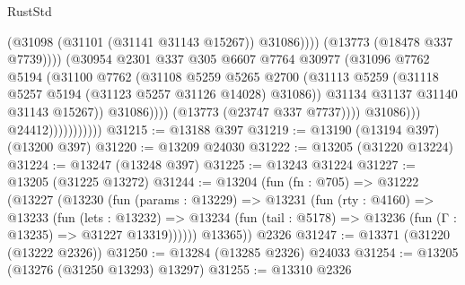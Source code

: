\begin{lexlean}{RustStd}
\begin{coremodule}
                                                  (@31098 (@31101 (@31141 @31143 @15267)) @31086))))
                                            (@13773 (@18478 @337 @7739))))
                                        (@30954
                                          @2301
                                          @337
                                          @305
                                          @6607
                                          @7764
                                          @30977
                                          (@31096
                                            @7762
                                            @5194
                                            (@31100
                                              @7762
                                              (@31108
                                                @5259
                                                @5265
                                                @2700
                                                (@31113
                                                  @5259
                                                  (@31118
                                                    @5257
                                                    @5194
                                                    (@31123 @5257 @31126 @14028)
                                                    @31086))
                                                @31134
                                                @31137
                                                @31140
                                                @31143
                                                @15267))
                                            @31086))))
                                    (@13773 (@23747 @337 @7737))))
                                @31086)))
                          @24412)))))))))))
@31215 := @13188 @397
@31219 := @13190 (@13194 @397) (@13200 @397)
@31220 := @13209 @24030
@31222 := @13205 (@31220 @13224)
@31224 := @13247 (@13248 @397)
@31225 := @13243 @31224
@31227 := @13205 (@31225 @13272)
@31244 := @13204
    (fun (fn : @705) =>
    @31222
      (@13227
        (@13230
          (fun (params : @13229) =>
          @13231
            (fun (rty : @4160) =>
            @13233
              (fun (lets : @13232) =>
              @13234 (fun (tail : @5178) => @13236 (fun (Γ : @13235) => @31227 @13319))))))
        @13365))
    @2326
@31247 := @13371 (@31220 (@13222 @2326))
@31250 := @13284 (@13285 @2326) @24033
@31254 := @13205 (@13276 (@31250 @13293) @13297)
@31255 := @13310 @2326

\end{coremodule}
\end{lexlean}
